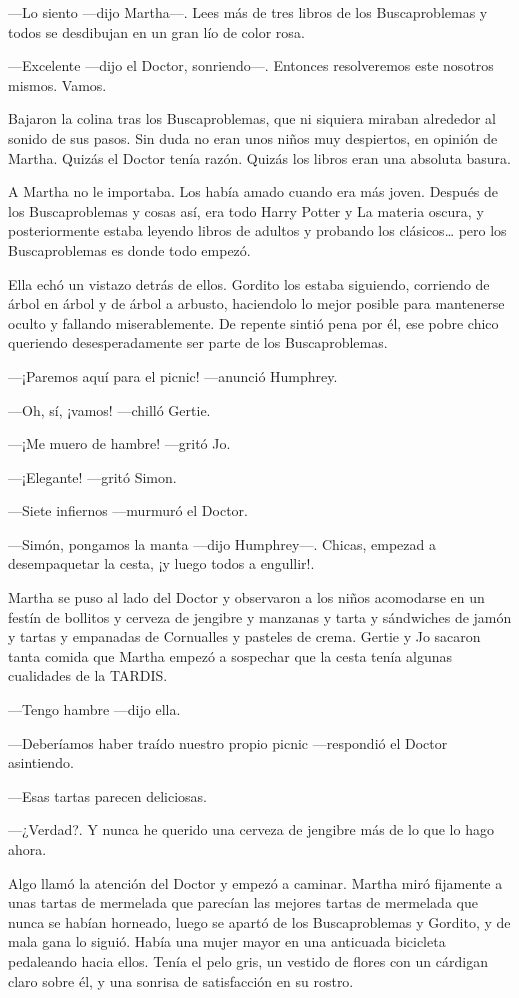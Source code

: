 ---Lo siento ---dijo Martha---. Lees más de tres libros de los Buscaproblemas y todos se desdibujan en un gran lío de color rosa.

---Excelente ---dijo el Doctor, sonriendo---. Entonces resolveremos este nosotros mismos. Vamos.

Bajaron la colina tras los Buscaproblemas, que ni siquiera miraban alrededor al sonido de sus pasos. Sin duda no eran unos niños muy despiertos, en opinión de Martha. Quizás el Doctor tenía razón. Quizás los libros eran una absoluta basura.

A Martha no le importaba. Los había amado cuando era más joven. Después de los Buscaproblemas y cosas así, era todo Harry Potter y La materia oscura, y posteriormente estaba leyendo libros de adultos y probando los clásicos\ldots{} pero los Buscaproblemas es donde todo empezó.

Ella echó un vistazo detrás de ellos. Gordito los estaba siguiendo, corriendo de árbol en árbol y de árbol a arbusto, haciendolo lo mejor posible para mantenerse oculto y fallando miserablemente. De repente sintió pena por él, ese pobre chico queriendo desesperadamente ser parte de los Buscaproblemas.

---¡Paremos aquí para el picnic! ---anunció Humphrey.

---Oh, sí, ¡vamos! ---chilló Gertie.

---¡Me muero de hambre! ---gritó Jo.

---¡Elegante! ---gritó Simon.

---Siete infiernos ---murmuró el Doctor.

---Simón, pongamos la manta ---dijo Humphrey---. Chicas, empezad a desempaquetar la cesta, ¡y luego todos a engullir!.

Martha se puso al lado del Doctor y observaron a los niños acomodarse en un festín de bollitos y cerveza de jengibre y manzanas y tarta y sándwiches de jamón y tartas y empanadas de Cornualles y pasteles de crema. Gertie y Jo sacaron tanta comida que Martha empezó a sospechar que la cesta tenía algunas cualidades de la TARDIS.

---Tengo hambre ---dijo ella.

---Deberíamos haber traído nuestro propio picnic ---respondió el Doctor asintiendo.

---Esas tartas parecen deliciosas.

---¿Verdad?. Y nunca he querido una cerveza de jengibre más de lo que lo hago ahora.

Algo llamó la atención del Doctor y empezó a caminar. Martha miró fijamente a unas tartas de mermelada que parecían las mejores tartas de mermelada que nunca se habían horneado, luego se apartó de los Buscaproblemas y Gordito, y de mala gana lo siguió. Había una mujer mayor en una anticuada bicicleta pedaleando hacia ellos. Tenía el pelo gris, un vestido de flores con un cárdigan claro sobre él, y una sonrisa de satisfacción en su rostro.

